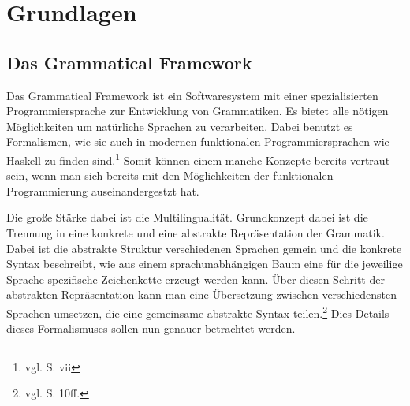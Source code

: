 \documentclass[12pt,abstract=on,titlepage,bibliography=totoc,ngerman,listof=totoc]{scrreprt}
\begin{document}
\chapter{Grundlagen}
\label{chap:grundlagen}
\section{Das Grammatical Framework}
\label{sec:gf}
Das Grammatical Framework ist ein Softwaresystem mit einer spezialisierten Programmiersprache zur Entwicklung von Grammatiken. Es bietet alle nötigen Möglichkeiten um natürliche Sprachen zu verarbeiten. Dabei benutzt es Formalismen, wie sie auch in modernen funktionalen Programmiersprachen wie Haskell zu finden sind.\footnote{vgl. \cite{RANTA2011} S. vii} Somit können einem manche Konzepte bereits vertraut sein, wenn man sich bereits mit den Möglichkeiten der funktionalen Programmierung auseinandergestzt hat.\par 
Die große Stärke dabei ist die Multilingualität. Grundkonzept dabei ist die Trennung in eine konkrete und eine abstrakte Repräsentation der Grammatik. Dabei ist die abstrakte Struktur verschiedenen Sprachen gemein und die konkrete Syntax beschreibt, wie aus einem sprachunabhängigen Baum eine für die jeweilige Sprache spezifische Zeichenkette erzeugt werden kann. Über diesen Schritt der abstrakten Repräsentation kann man eine Übersetzung zwischen verschiedensten Sprachen umsetzen, die eine gemeinsame abstrakte Syntax teilen.\footnote{vgl. \cite{RANTA2011} S. 10ff.} Dies Details dieses Formalismuses sollen nun genauer betrachtet werden.
\end{document}
